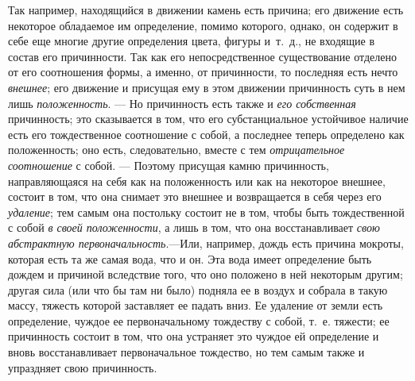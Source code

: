 Так например, находящийся в движении камень есть причина; его движение есть
некоторое обладаемое им определение, помимо которого, однако, он содержит в
себе еще многие другие определения цвета, фигуры и~т.~д., не входящие в
состав его причинности. Так как его непосредственное существование отделено
от его соотношения формы, а именно, от причинности, то последняя есть нечто
{\em внешнее}; его движение и присущая ему в этом
движении причинность суть в нем лишь
{\em положенность}. — Но причинность есть также и
{\em его собственная} причинность; это сказывается в
том, что его субстанциальное устойчивое наличие есть его тождественное
соотношение с собой, а последнее теперь определено как положенность; оно
есть, следовательно, вместе с тем {\em отрицательное
соотношение} с собой. — Поэтому присущая камню причинность, направляющаяся
на себя как на положенность или как на некоторое внешнее, состоит в том,
что она снимает это внешнее и возвращается в себя через его
{\em удаление}; тем самым она постольку состоит не в
том, чтобы быть тождественной с собой {\em в своей
положенности}, а лишь в том, что она восстанавливает
{\em свою абстрактную первоначальность}.—Или, например,
дождь есть причина мокроты, которая есть та же самая вода, что и он. Эта
вода имеет определение быть дождем и причиной вследствие того, что оно
положено в ней некоторым другим; другая сила (или что бы там ни было)
подняла ее в воздух и собрала в такую массу, тяжесть которой заставляет ее
падать вниз. Ее удаление от земли есть определение, чуждое ее
первоначальному тождеству с собой, т.~е. тяжести; ее причинность состоит в
том, что она устраняет это чуждое ей определение и вновь восстанавливает
первоначальное тождество, но тем самым также и упраздняет свою причинность.

